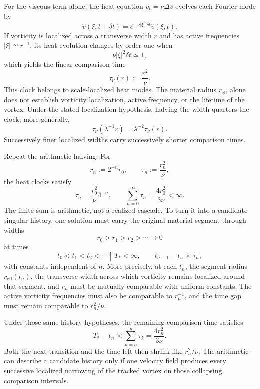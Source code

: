 For the viscous term alone, the heat equation \(v_t=\nu\Delta v\) evolves each Fourier mode by
\[
  \widehat v(\xi,t+\delta t)
  =
  e^{-\nu|\xi|^2\delta t}\widehat v(\xi,t).
\]
If vorticity is localized across a transverse width \(r\) and has active frequencies \(|\xi|\simeq r^{-1}\), its heat evolution changes by order one when
\[
  \nu|\xi|^2\delta t\simeq1,
\]
which yields the linear comparison time
\[
  \tau_\nu(r)
  :=
  \frac{r^2}{\nu}.
\]
This clock belongs to scale-localized heat modes. The material radius \(r_{\mathrm{eff}}\) alone does not establish vorticity localization, active frequency, or the lifetime of the vortex. Under the stated localization hypothesis, halving the width quarters the clock; more generally,
\[
  \tau_\nu(\lambda^{-1}r)
  =
  \lambda^{-2}\tau_\nu(r).
\]
Successively finer localized widths carry successively shorter comparison times.


Repeat the arithmetic halving. For
\[
  r_n:=2^{-n}r_0,
  \qquad
  \tau_n:=\frac{r_n^2}{\nu},
\]
the heat clocks satisfy
\[
  \tau_n
  =
  \frac{r_0^2}{\nu}4^{-n},
  \qquad
  \sum_{n=0}^{\infty}\tau_n
  =
  \frac{4r_0^2}{3\nu}
  <
  \infty.
\]
The finite sum is arithmetic, not a realized cascade. To turn it into a candidate singular history, one \NavierStokes{} solution must carry the original material segment through widths
\[
  r_0>r_1>r_2>\cdots\longrightarrow0
\]
at times
\[
  t_0<t_1<t_2<\cdots\uparrow T_*<\infty,
  \qquad
  t_{n+1}-t_n\asymp\tau_n,
\]
with constants independent of \(n\). More precisely, at each \(t_n\), the segment radius \(r_{\mathrm{eff}}(t_n)\), the transverse width across which vorticity remains localized around that segment, and \(r_n\) must be mutually comparable with uniform constants. The active vorticity frequencies must also be comparable to \(r_n^{-1}\), and the time gap must remain comparable to \(r_n^2/\nu\).

Under those same-history hypotheses, the remaining comparison time satisfies
\[
  T_*-t_n
  \asymp
  \sum_{k=n}^{\infty}\tau_k
  =
  \frac{4r_n^2}{3\nu}.
\]
Both the next transition and the time left then shrink like \(r_n^2/\nu\). The arithmetic can describe a candidate history only if one velocity field produces every successive localized narrowing of the tracked vortex on those collapsing comparison intervals.
